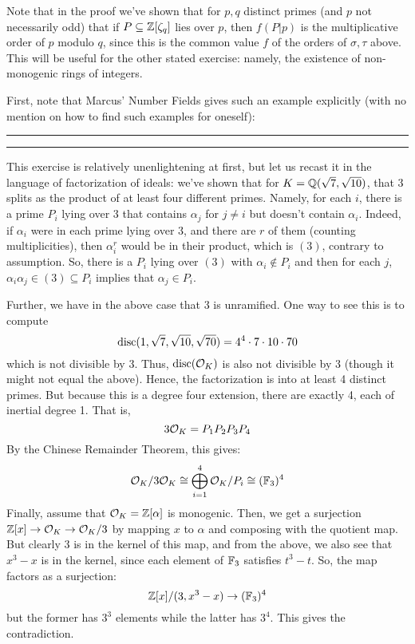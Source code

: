 Note that in the proof we've shown that for $p,q$ distinct primes (and $p$ not necessarily odd) that if $P \subseteq \mathbb{Z}[\zeta_q]$ lies over $p$, then $f(P|p)$ is the multiplicative order of $p$ modulo $q$, since this is the common value $f$ of the orders of $\sigma,\tau$ above. This will be useful for the other stated exercise: namely, the existence of non-monogenic rings of integers.

First, note that Marcus' Number Fields gives such an example explicitly (with no mention on how to find such examples for oneself): \\

\hrule



\hrule

${}$ \\

This exercise is relatively unenlightening at first, but let us recast it in the language of factorization of ideals: we've shown that for $K = \mathbb{Q}(\sqrt{7},\sqrt{10})$, that 3 splits as the product of at least four different primes. Namely, for each $i$, there is a prime $P_i$ lying over 3 that contains $\alpha_j$ for $j \neq i$ but doesn't contain $\alpha_i$. Indeed, if $\alpha_i$ were in each prime lying over $3$, and there are $r$ of them (counting multiplicities), then $\alpha_i^r$ would be in their product, which is $(3)$, contrary to assumption. So, there is a $P_i$ lying over $(3)$ with $\alpha_i \notin P_i$ and then for each $j$, $\alpha_i\alpha_j \in (3) \subseteq P_i$ implies that $\alpha_j \in P_i$.

Further, we have in the above case that 3 is unramified. One way to see this is to compute
\[ \operatorname{disc}(1,\sqrt{7},\sqrt{10},\sqrt{70}) = 4^4 \cdot 7 \cdot 10 \cdot 70 \]
which is not divisible by $3$. Thus, $\operatorname{disc}(\mathcal{O}_K)$ is also not divisible by 3 (though it might not equal the above). Hence, the factorization is into at least 4 distinct primes. But because this is a degree four extension, there are exactly 4, each of inertial degree 1. That is,
\[ 3\mathcal{O}_K = P_1P_2P_3P_4 \]
By the Chinese Remainder Theorem, this gives:
\[ \mathcal{O}_K/3\mathcal{O}_K \cong \bigoplus_{i=1}^4 \mathcal{O}_K/P_i \cong (\mathbb{F}_3)^4 \]
Finally, assume that $\mathcal{O}_K = \mathbb{Z}[\alpha]$ is monogenic. Then, we get a surjection $\mathbb{Z}[x] \to \mathcal{O}_K \to \mathcal{O}_K/3$ by mapping $x$ to $\alpha$ and composing with the quotient map. But clearly 3 is in the kernel of this map, and from the above, we also see that $x^3-x$ is in the kernel, since each element of $\mathbb{F}_3$ satisfies $t^3-t$. So, the map factors as a surjection:
\[ \mathbb{Z}[x]/(3,x^3-x) \to (\mathbb{F}_3)^4 \]
but the former has $3^3$ elements while the latter has $3^4$. This gives the contradiction.

